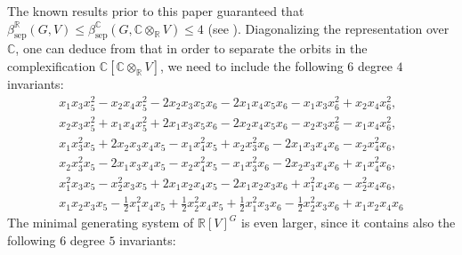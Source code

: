 \documentclass[12pt, oneside]{amsart}
\def\RR{\mathbb{R}}
\def\CC{\mathbb{C}}
\def\sepbeta{\beta_{\mathrm{sep}}}
\begin{document}
The known results prior to this paper guaranteed that 
$\sepbeta^\RR(G,V)\le\sepbeta^\CC(G,\CC\otimes_\RR V)\le 4$ (see \cite{domokos:abelian}). 
Diagonalizing the representation over $\CC$, one can deduce from \cite[Proposition 2.4]{domokos:abelian} that 
in order to separate the orbits in the complexification $\CC[\CC\otimes_\RR V]$, 
we need to include the following $6$ degree $4$ invariants: 
\begin{align*} 
x_{1} x_{3} x_{5}^{2} - x_{2} x_{4} x_{5}^{2} - 2 x_{2} x_{3} x_{5} x_{6} - 2 x_{1} x_{4} x_{5} x_{6} - x_{1} x_{3} x_{6}^{2} + x_{2} x_{4} x_{6}^{2}, 
\\ x_{2} x_{3} x_{5}^{2} + x_{1} x_{4} x_{5}^{2} + 2 x_{1} x_{3} x_{5} x_{6} - 2 x_{2} x_{4} x_{5} x_{6} - x_{2} x_{3} x_{6}^{2} - x_{1} x_{4} x_{6}^{2}, 
\\ x_{1} x_{3}^{2} x_{5} + 2 x_{2} x_{3} x_{4} x_{5} - x_{1} x_{4}^{2} x_{5} + x_{2} x_{3}^{2} x_{6} - 2 x_{1} x_{3} x_{4} x_{6} - x_{2} x_{4}^{2} x_{6}, 
\\ x_{2} x_{3}^{2} x_{5} - 2 x_{1} x_{3} x_{4} x_{5} - x_{2} x_{4}^{2} x_{5} - x_{1} x_{3}^{2} x_{6} - 2 x_{2} x_{3} x_{4} x_{6} + x_{1} x_{4}^{2} x_{6}, 
\\ x_{1}^{2} x_{3} x_{5} - x_{2}^{2} x_{3} x_{5} + 2 x_{1} x_{2} x_{4} x_{5} - 2 x_{1} x_{2} x_{3} x_{6} + x_{1}^{2} x_{4} x_{6} - x_{2}^{2} x_{4} x_{6}, 
\\x_{1} x_{2} x_{3} x_{5} - \frac{1}{2} x_{1}^{2} x_{4} x_{5} + \frac{1}{2} x_{2}^{2} x_{4} x_{5} + \frac{1}{2} x_{1}^{2} x_{3} x_{6} - \frac{1}{2} x_{2}^{2} x_{3} x_{6} + x_{1} x_{2} x_{4} x_{6}\end{align*}   
The minimal generating system of $\RR[V]^G$ is even larger, since it contains also the following $6$ degree $5$ invariants: 
\end{document}
